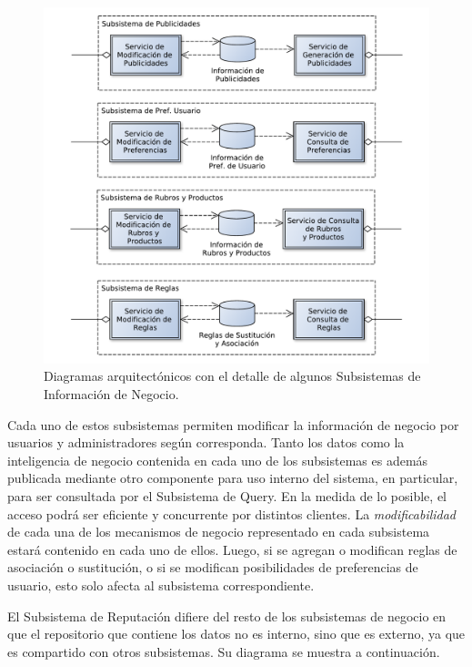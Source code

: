 \begin{figure}[H]
	\centering
	\includegraphics[width=\textwidth]{graficos/arch/subsistemas_neg.pdf}
	\caption{Diagramas arquitectónicos con el detalle de algunos \textsf{Subsistemas de Información de Negocio}.}
\end{figure}

Cada uno de estos subsistemas permiten modificar la información de negocio por usuarios y administradores según corresponda. Tanto los datos como la inteligencia de negocio contenida en cada uno de los subsistemas es además publicada mediante otro componente para uso interno del sistema, en particular, para ser consultada por el \textsf{Subsistema de Query}. En la medida de lo posible, el acceso podrá ser eficiente y concurrente por distintos clientes. La \emph{modificabilidad} de cada una de los mecanismos de negocio representado en cada subsistema estará contenido en cada uno de ellos. Luego, si se agregan o modifican reglas de asociación o sustitución, o si se modifican posibilidades de preferencias de usuario, esto solo afecta al subsistema correspondiente.

El \textsf{Subsistema de Reputación} difiere del resto de los subsistemas de negocio en que el repositorio que contiene los datos no es interno, sino que es externo, ya que es compartido con otros subsistemas. Su diagrama se muestra a continuación. 

